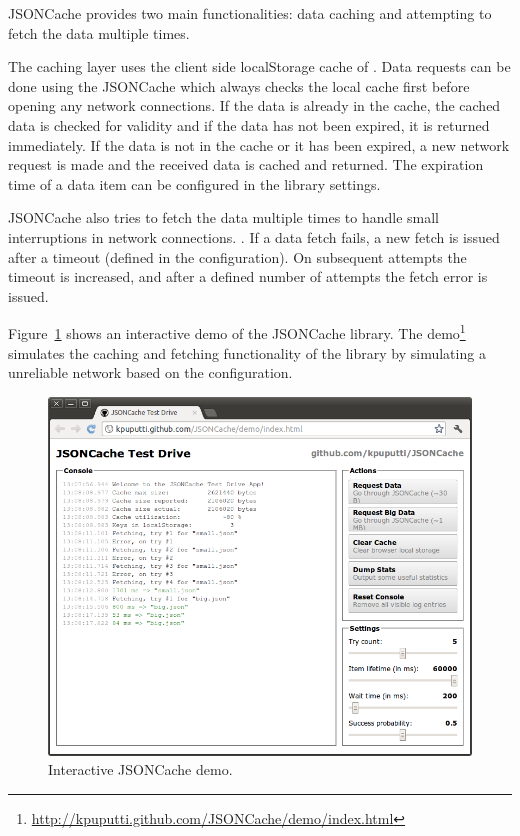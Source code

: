 JSONCache provides two main functionalities: data caching and
attempting to fetch the data multiple times.

The caching layer uses the client side localStorage \citationneeded
cache of . Data requests can be done using the JSONCache
 which always checks the local cache first before opening
any network connections. If the data is already in the cache, the
cached data is checked for validity and if the data has not been
expired, it is returned immediately. If the data is not in the cache
or it has been expired, a new network request is made and the received
data is cached and returned. The expiration time of a data item can be
configured in the library settings.

JSONCache also tries to fetch the data multiple times to handle small
interruptions in network connections. . If a data fetch fails, a new fetch is
issued after a timeout (defined in the configuration). On subsequent
attempts the timeout is increased, and after a defined number of
attempts the fetch error is issued.

Figure~\ref{figure:jsoncache-demo.png} shows an interactive demo of
the JSONCache library. The
demo\footnote{\url{http://kpuputti.github.com/JSONCache/demo/index.html}}
simulates the caching and fetching functionality of the library by
simulating a unreliable network based on the configuration.

\begin{figure}[ht]
  \begin{center}
    \includegraphics[width=\textwidth]{images/jsoncache-demo.png}
    \caption{Interactive JSONCache demo.}
    \label{figure:jsoncache-demo.png}
  \end{center}
\end{figure}
